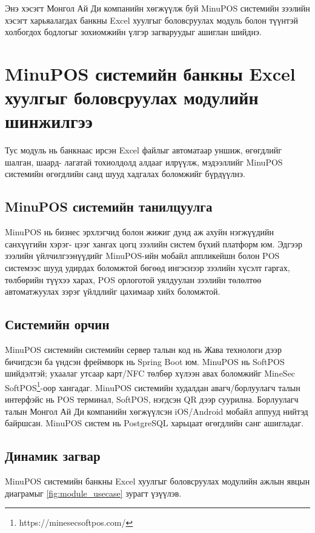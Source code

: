 Энэ хэсэгт Монгол Ай Ди компанийн хөгжүүлж буй MinuPOS системийн зээлийн хэсэгт харьяалагдах банкны Excel хуулгыг боловсруулах модуль болон түүнтэй холбогдох бодлогыг зохиомжийн үлгэр загваруудыг ашиглан шийднэ.
\section{MinuPOS системийн банкны Excel хуулгыг боловсруулах модулийн шинжилгээ}
Тус модуль нь банкнаас ирсэн Excel файлыг автоматаар уншиж, өгөгдлийг шалган, шаард- лагатай тохиолдолд алдааг илрүүлж, мэдээллийг MinuPOS системийн өгөгдлийн санд шууд хадгалах боломжийг бүрдүүлнэ.
\subsection{MinuPOS системийн танилцуулга}
MinuPOS нь бизнес эрхлэгчид болон жижиг дунд аж ахуйн нэгжүүдийн санхүүгийн хэрэг- цээг хангах цогц зээлийн систем бүхий платформ юм. Эдгээр зээлийн үйлчилгээнүүдийг MinuPOS-ийн мобайл аппликейшн болон POS системээс шууд удирдах боломжтой бөгөөд ингэснээр зээлийн хүсэлт гаргах, төлбөрийн түүхээ харах, POS орлоготой уялдуулан зээлийн төлөлтөө автоматжуулах зэрэг үйлдлийг цахимаар хийх боломжтой.
\subsection{Системийн орчин}

MinuPOS системийн системийн сервер талын код нь Жава технологи дээр бичигдсэн ба үндсэн фреймворк нь Spring Boot юм. MinuPOS нь SoftPOS шийдэлтэй; ухаалаг утсаар карт/NFC төлбөр хүлээн авах боломжийг MineSec SoftPOS\footnote{https://minesecsoftpos.com/}-оор хангадаг.
MinuPOS системийн худалдан авагч/борлуулагч талын интерфэйс нь POS терминал, SoftPOS, нэгдсэн QR дээр суурилна. Борлуулагч талын Монгол Ай Ди компанийн хөгжүүлсэн iOS/Android мобайл аппууд нийтэд байршсан.
MinuPOS систем нь PostgreSQL харьцаат өгөгдлийн санг ашигладаг.

\subsection{Динамик загвар}
MinuPOS системийн банкны Excel хуулгыг боловсруулах модулийн ажлын явцын диаграмыг \ref{fig:module_usecase} зурагт үзүүлэв. 



